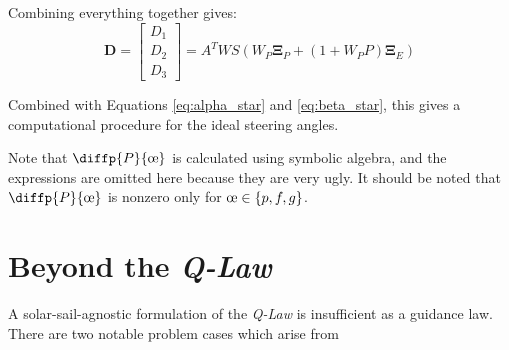 Combining everything together gives:
\begin{equation}
  \boldsymbol{D} = \begin{bmatrix}
    D_1 \\D_2\\D_3
  \end{bmatrix} = A^T W S \left(W_P \boldsymbol{\Xi}_P + (1 + W_P P) \boldsymbol{\Xi}_E \right)
\end{equation}

Combined with Equations \ref{eq:alpha_star} and \ref{eq:beta_star}, this gives a computational procedure for the ideal steering angles.

Note that \(\diffp{P}{{\moe}}\) is calculated using symbolic algebra, and the expressions are omitted here because they are very ugly. It should be noted that \(\diffp{P}{{\moe}}\) is nonzero only for \(\moe \in \{p, f, g\}\).

\section{Beyond the \textit{Q-Law}}
A solar-sail-agnostic formulation of the \textit{Q-Law} is insufficient as a guidance law. There are two notable problem cases which arise from

